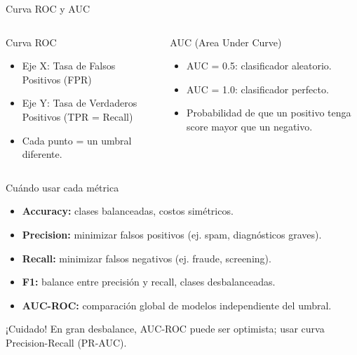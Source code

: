\documentclass[aspectratio=169, 10pt, xcolor=table]{beamer}
\begin{document}
\begin{frame}{Curva ROC y AUC}
    \begin{columns}[t]
        \begin{block}{Curva ROC}
            \begin{itemize}
                \item Eje X: Tasa de Falsos Positivos (FPR)
                \item Eje Y: Tasa de Verdaderos Positivos (TPR = Recall)
                \item Cada punto = un umbral diferente.
            \end{itemize}
        \end{block}
        \begin{block}{AUC (Area Under Curve)}
            \begin{itemize}
                \item AUC = 0.5: clasificador aleatorio.
                \item AUC = 1.0: clasificador perfecto.
                \item Probabilidad de que un positivo tenga score mayor que un negativo.
            \end{itemize}
        \end{block}
    \end{columns}
\end{frame}

\begin{frame}{Cuándo usar cada métrica}
    \begin{itemize}
        \item \textbf{Accuracy:} clases balanceadas, costos simétricos.
        \item \textbf{Precision:} minimizar falsos positivos (ej. spam, diagnósticos graves).
        \item \textbf{Recall:} minimizar falsos negativos (ej. fraude, screening).
        \item \textbf{F1:} balance entre precisión y recall, clases desbalanceadas.
        \item \textbf{AUC-ROC:} comparación global de modelos independiente del umbral.
    \end{itemize}
    \vspace{0.3cm}
    \begin{alertblock}{¡Cuidado!}
        En gran desbalance, AUC-ROC puede ser optimista; usar curva Precision-Recall (PR-AUC).
    \end{alertblock}
\end{frame}
\end{document}

